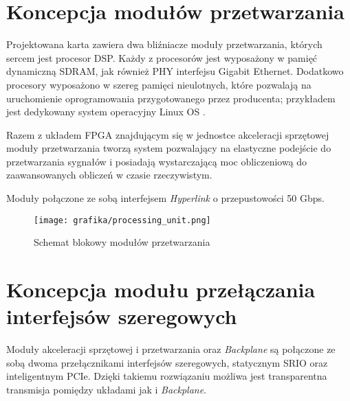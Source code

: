\section{Koncepcja modułów przetwarzania}
Projektowana karta zawiera dwa bliźniacze moduły przetwarzania, których sercem jest procesor DSP. Każdy z procesorów  jest wyposażony w pamięć dynamiczną SDRAM, jak również PHY interfejsu Gigabit Ethernet. Dodatkowo procesory wyposażono w szereg pamięci nieulotnych, które pozwalają na uruchomienie oprogramowania przygotowanego przez producenta; przykładem jest dedykowany system operacyjny Linux OS \cite{SOFT:LINUX}. 

Razem z układem FPGA znajdującym się w jednostce akceleracji sprzętowej moduły przetwarzania tworzą system pozwalający na elastyczne podejście do przetwarzania sygnałów i posiadają wystarczającą moc obliczeniową do zaawansowanych obliczeń w czasie rzeczywistym. 

Moduły połączone ze sobą interfejsem \textit{Hyperlink} \cite{HYPER} o przepustowości 50 Gbps.
\begin{figure}[here]
\begin{center}
\texttt{[image: grafika/processing\_unit.png]}
\end{center}
\caption{Schemat blokowy modułów przetwarzania}
\label{BLOCK_PROCESS}
\end{figure}
\section{Koncepcja modułu przełączania interfejsów szeregowych} 
Moduły akceleracji sprzętowej i przetwarzania oraz \textit{Backplane} są połączone ze sobą dwoma przełącznikami interfejsów szeregowych, statycznym SRIO oraz inteligentnym PCIe. Dzięki takiemu rozwiązaniu możliwa jest transparentna transmisja pomiędzy układami jak i \textit{Backplane}.

